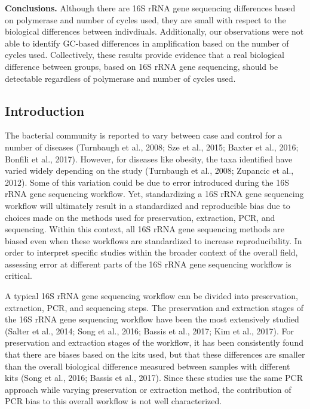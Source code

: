 \documentclass[11pt,]{article}
\begin{document}
\textbf{Conclusions.} Although there are 16S rRNA gene sequencing
differences based on polymerase and number of cycles used, they are
small with respect to the biological differences between indivdiuals.
Additionally, our observations were not able to identify GC-based
differences in amplification based on the number of cycles used.
Collectively, these results provide evidence that a real biological
difference between groups, based on 16S rRNA gene sequencing, should be
detectable regardless of polymerase and number of cycles used.

\newpage

\subsection{Introduction}\label{introduction}

The bacterial community is reported to vary between case and control for
a number of diseases (Turnbaugh et al., 2008; Sze et al., 2015; Baxter
et al., 2016; Bonfili et al., 2017). However, for diseases like obesity,
the taxa identified have varied widely depending on the study (Turnbaugh
et al., 2008; Zupancic et al., 2012). Some of this variation could be
due to error introduced during the 16S rRNA gene sequencing workflow.
Yet, standardizing a 16S rRNA gene sequencing workflow will ultimately
result in a standardized and reproducible bias due to choices made on
the methods used for preservation, extraction, PCR, and sequencing.
Within this context, all 16S rRNA gene sequencing methods are biased
even when these workflows are standardized to increase reproducibility.
In order to interpret specific studies within the broader context of the
overall field, assessing error at different parts of the 16S rRNA gene
sequencing workflow is critical.

A typical 16S rRNA gene sequencing workflow can be divided into
preservation, extraction, PCR, and sequencing steps. The preservation
and extraction stages of the 16S rRNA gene sequencing workflow have been
the most extensively studied (Salter et al., 2014; Song et al., 2016;
Bassis et al., 2017; Kim et al., 2017). For preservation and extraction
stages of the workflow, it has been consistently found that there are
biases based on the kits used, but that these differences are smaller
than the overall biological difference measured between samples with
different kits (Song et al., 2016; Bassis et al., 2017). Since these
studies use the same PCR approach while varying preservation or
extraction method, the contribution of PCR bias to this overall workflow
is not well characterized.
\end{document}
